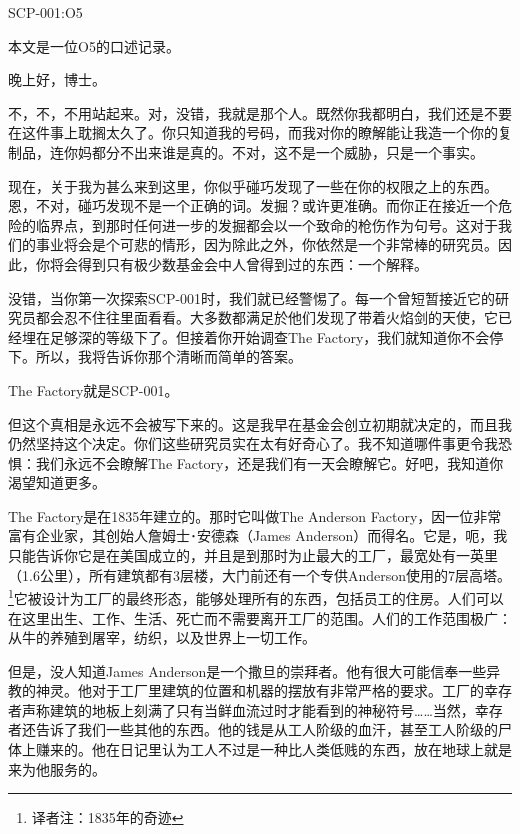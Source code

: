 \documentclass[openany,a4paper]{book} %
\begin{document}
{\Large\color{red}SCP-001:O5}\vspace{12pt}

本文是一位O5的口述记录。\vspace{12pt}

晚上好，博士。\vspace{12pt}

不，不，不用站起来。对，没错，我就是那个人。既然你我都明白，我们还是不要在这件事上耽搁太久了。你只知道我的号码，而我对你的瞭解能让我造一个你的复制品，连你妈都分不出来谁是真的。不对，这不是一个威胁，只是一个事实。\vspace{12pt}

现在，关于我为甚么来到这里，你似乎碰巧发现了一些在你的权限之上的东西。恩，不对，碰巧发现不是一个正确的词。发掘？或许更准确。而你正在接近一个危险的临界点，到那时任何进一步的发掘都会以一个致命的枪伤作为句号。这对于我们的事业将会是个可悲的情形，因为除此之外，你依然是一个非常棒的研究员。因此，你将会得到只有极少数基金会中人曾得到过的东西：一个解释。\vspace{12pt}

没错，当你第一次探索SCP-001时，我们就已经警惕了。每一个曾短暂接近它的研究员都会忍不住往里面看看。大多数都满足於他们发现了带着火焰剑的天使，它已经埋在足够深的等级下了。但接着你开始调查The Factory，我们就知道你不会停下。所以，我将告诉你那个清晰而简单的答案。\vspace{12pt}

The Factory就是SCP-001。\vspace{12pt}

但这个真相是永远不会被写下来的。这是我早在基金会创立初期就决定的，而且我仍然坚持这个决定。你们这些研究员实在太有好奇心了。我不知道哪件事更令我恐惧：我们永远不会瞭解The Factory，还是我们有一天会瞭解它。好吧，我知道你渴望知道更多。\vspace{12pt}

The Factory是在1835年建立的。那时它叫做The Anderson Factory，因一位非常富有企业家，其创始人詹姆士･安德森（James Anderson）而得名。它是，呃，我只能告诉你它是在美国成立的，并且是到那时为止最大的工厂，最宽处有一英里（1.6公里），所有建筑都有3层楼，大门前还有一个专供Anderson使用的7层高塔。\footnote{译者注：1835年的奇迹}它被设计为工厂的最终形态，能够处理所有的东西，包括员工的住房。人们可以在这里出生、工作、生活、死亡而不需要离开工厂的范围。人们的工作范围极广：从牛的养殖到屠宰，纺织，以及世界上一切工作。\vspace{12pt}

但是，没人知道James Anderson是一个撒旦的崇拜者。他有很大可能信奉一些异教的神灵。他对于工厂里建筑的位置和机器的摆放有非常严格的要求。工厂的幸存者声称建筑的地板上刻满了只有当鲜血流过时才能看到的神秘符号……当然，幸存者还告诉了我们一些其他的东西。他的钱是从工人阶级的血汗，甚至工人阶级的尸体上赚来的。他在日记里认为工人不过是一种比人类低贱的东西，放在地球上就是来为他服务的。\vspace{12pt}
\end{document}
